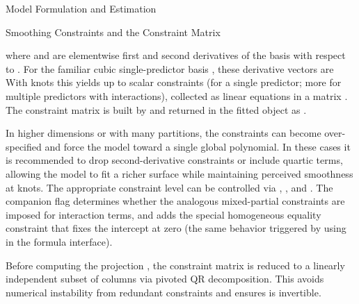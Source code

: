 \begin{Section}{Model Formulation and Estimation}
\begin{SubSection}{Smoothing Constraints and the Constraint Matrix}
\begin{enumerate}
\end{enumerate}

where  and  are
elementwise first and second derivatives of the basis with respect to
. For the familiar cubic single-predictor basis
, these derivative vectors are
With  knots this yields up to  scalar
constraints (for a single predictor; more for multiple predictors with
interactions), collected as linear equations
in a  matrix . The constraint matrix is
built by  and returned in the fitted
object as .

In higher dimensions or with many partitions, the constraints can become
over-specified and force the model toward a single global polynomial. In these
cases it is recommended to drop second-derivative constraints or include quartic
terms, allowing the model to fit a richer surface while maintaining
perceived smoothness at knots. The appropriate constraint level can be
controlled via ,
, and
.
The companion flag  determines whether
the analogous mixed-partial constraints are imposed for interaction terms,
and  adds the special homogeneous equality constraint that
fixes the intercept at zero (the same behavior triggered by using
 in the formula interface).

Before computing the projection , the constraint matrix is
reduced to a linearly independent subset of columns via pivoted QR
decomposition. This avoids numerical instability from redundant constraints
and ensures  is invertible.
\end{SubSection}



\end{Section}
